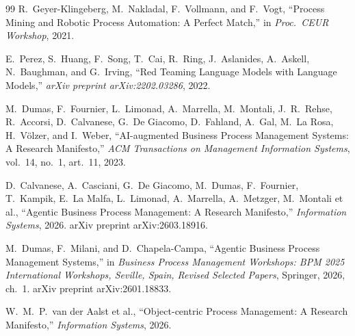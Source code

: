 \documentclass[11pt,a4paper]{article}
\begin{document}
\begin{thebibliography}{99}
R.\ Geyer-Klingeberg, M.\ Nakladal, F.\ Vollmann, and F.\ Vogt,
``Process Mining and Robotic Process Automation: A Perfect Match,''
in \emph{Proc.\ CEUR Workshop}, 2021.

E.\ Perez, S.\ Huang, F.\ Song, T.\ Cai, R.\ Ring, J.\ Aslanides,
A.\ Askell, N.\ Baughman, and G.\ Irving,
``Red Teaming Language Models with Language Models,''
\emph{arXiv preprint arXiv:2202.03286}, 2022.

M.\ Dumas, F.\ Fournier, L.\ Limonad, A.\ Marrella, M.\ Montali,
J.\ R.\ Rehse, R.\ Accorsi, D.\ Calvanese, G.\ De Giacomo,
D.\ Fahland, A.\ Gal, M.\ La Rosa, H.\ V\"olzer, and I.\ Weber,
``AI-augmented Business Process Management Systems: A Research Manifesto,''
\emph{ACM Transactions on Management Information Systems},
vol.\ 14, no.\ 1, art.\ 11, 2023.

D.\ Calvanese, A.\ Casciani, G.\ De Giacomo, M.\ Dumas, F.\ Fournier,
T.\ Kampik, E.\ La Malfa, L.\ Limonad, A.\ Marrella, A.\ Metzger,
M.\ Montali et al.,
``Agentic Business Process Management: A Research Manifesto,''
\emph{Information Systems}, 2026.
arXiv preprint arXiv:2603.18916.

M.\ Dumas, F.\ Milani, and D.\ Chapela-Campa,
``Agentic Business Process Management Systems,''
in \emph{Business Process Management Workshops: BPM 2025
International Workshops, Seville, Spain, Revised Selected Papers},
Springer, 2026, ch.\ 1.
arXiv preprint arXiv:2601.18833.

W.\ M.\ P.\ van der Aalst et al.,
``Object-centric Process Management: A Research Manifesto,''
\emph{Information Systems}, 2026.

\end{thebibliography}
\end{document}
